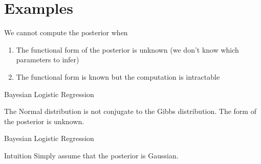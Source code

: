 \documentclass[14pt]{beamer}
\begin{document}
\section{Examples}
\frame{\tableofcontents[currentsection]}

\begin{frame}{We cannot compute the posterior when}
\begin{enumerate}
\item The functional form of the posterior is unknown (we don't know which parameters to infer)
\item The functional form is known but the computation is intractable
\end{enumerate}
\end{frame}

\begin{frame}{Bayesian Logistic Regression}
\begin{figure}
\end{figure}
The Normal distribution is not conjugate to the Gibbs distribution. The form of the posterior is unknown.
\end{frame}

\begin{frame}{Bayesian Logistic Regression}
\begin{block}{Intuition}
Simply assume that the posterior is Gaussian.
\end{block}
\end{frame}
\end{document}
